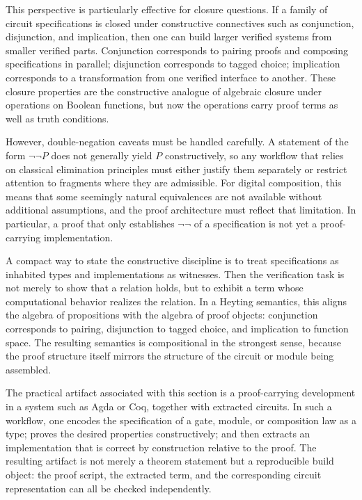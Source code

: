 This perspective is particularly effective for closure questions. If a family of circuit specifications is closed under constructive connectives such as conjunction, disjunction, and implication, then one can build larger verified systems from smaller verified parts. Conjunction corresponds to pairing proofs and composing specifications in parallel; disjunction corresponds to tagged choice; implication corresponds to a transformation from one verified interface to another. These closure properties are the constructive analogue of algebraic closure under operations on Boolean functions, but now the operations carry proof terms as well as truth conditions.

However, double-negation caveats must be handled carefully. A statement of the form \(\neg\neg P\) does not generally yield \(P\) constructively, so any workflow that relies on classical elimination principles must either justify them separately or restrict attention to fragments where they are admissible. For digital composition, this means that some seemingly natural equivalences are not available without additional assumptions, and the proof architecture must reflect that limitation. In particular, a proof that only establishes \(\neg\neg\) of a specification is not yet a proof-carrying implementation.

A compact way to state the constructive discipline is to treat specifications as inhabited types and implementations as witnesses. Then the verification task is not merely to show that a relation holds, but to exhibit a term whose computational behavior realizes the relation. In a Heyting semantics, this aligns the algebra of propositions with the algebra of proof objects: conjunction corresponds to pairing, disjunction to tagged choice, and implication to function space. The resulting semantics is compositional in the strongest sense, because the proof structure itself mirrors the structure of the circuit or module being assembled.

The practical artifact associated with this section is a proof-carrying development in a system such as Agda or Coq, together with extracted circuits. In such a workflow, one encodes the specification of a gate, module, or composition law as a type; proves the desired properties constructively; and then extracts an implementation that is correct by construction relative to the proof. The resulting artifact is not merely a theorem statement but a reproducible build object: the proof script, the extracted term, and the corresponding circuit representation can all be checked independently.

